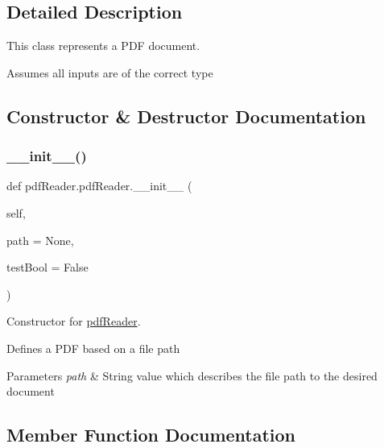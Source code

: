 \subsection{Detailed Description}
This class represents a P\+DF document. 

Assumes all inputs are of the correct type 

\subsection{Constructor \& Destructor Documentation}
\mbox{\label{classpdfReader_1_1pdfReader_af3a16920a7c67b75306a8c835779b883}} 
\subsubsection{\texorpdfstring{\+\_\+\+\_\+init\+\_\+\+\_\+()}{\_\_init\_\_()}}
{\footnotesize\ttfamily def pdf\+Reader.\+pdf\+Reader.\+\_\+\+\_\+init\+\_\+\+\_\+ (\begin{DoxyParamCaption}\item[{}]{self,  }\item[{}]{path = {\ttfamily None},  }\item[{}]{test\+Bool = {\ttfamily False} }\end{DoxyParamCaption})}



Constructor for \hyperlink{classpdfReader_1_1pdfReader}{pdf\+Reader}. 

Defines a P\+DF based on a file path 
\begin{DoxyParams}{Parameters}
{\em path} & String value which describes the file path to the desired document \\
\hline
\end{DoxyParams}


\subsection{Member Function Documentation}
\mbox{\label{classpdfReader_1_1pdfReader_ac4723dad588bceac770ba68cdd09e0e3}} 
